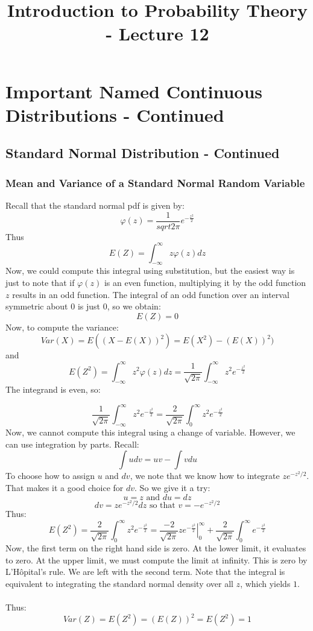 \documentclass[12pt]{article} %
\date{}
\title{Introduction to Probability Theory - Lecture 12}
\begin{document}
\maketitle

\section{Important Named Continuous Distributions - Continued}
\subsection{Standard Normal Distribution - Continued}
\subsubsection{Mean and Variance of a Standard Normal Random Variable}
Recall that the standard normal pdf is given by:
$$\varphi(z) = \frac1{sqrt{2\pi}}e^{-\frac{z^2}2}$$
Thus
$$E(Z) = \int_{-\infty}^{\infty}z\varphi(z) dz$$
Now, we could compute this integral using substitution, but the easiest way is just to note that if $\varphi(z)$ is an even function, multiplying it by the odd function $z$ results in an odd function. The integral of an odd function over an interval symmetric about $0$ is just 0, so we obtain:
$$E(Z) = 0$$ 
Now, to compute the variance:
$$Var(X) = E((X-E(X))^2) = E(X^2) - \left(E(X)\right)^2)$$
and
$$E(Z^2) = \int_{-\infty}^{\infty} z^2 \varphi(z) dz = \frac1{\sqrt{2\pi}}\int_{-\infty}^{\infty} z^2e^{-\frac{z^2}2} $$
The integrand is even, so:

$$ \frac1{\sqrt{2\pi}}\int_{-\infty}^{\infty} z^2e^{-\frac{z^2}2} =  \frac2{\sqrt{2\pi}}\int_{0}^{\infty} z^2e^{-\frac{z^2}2} $$
Now, we cannot compute this integral using a change of variable. However, we can use integration by parts. Recall:
$$\int u dv = uv - \int v du$$
To choose how to assign $u$ and $dv$, we note that we know how to integrate $ze^{-z^2/2}$. That makes it a good choice for $dv$. So we give it a try:
$$u=z \textrm{ and } du=dz$$
$$dv = ze^{-z^2/2}dz \textrm{ so that } v = -e^{-z^2/2}$$
Thus:
$$E(Z^2) =  \frac2{\sqrt{2\pi}}\int_{0}^{\infty} z^2e^{-\frac{z^2}2} = \frac{-2}{\sqrt{2\pi}} \left.z e^{-\frac{z^2}2}\right\rvert_0^\infty + \frac2{\sqrt{2\pi}}\int_{0}^{\infty} e^{-\frac{z^2}2}$$
Now, the first term on the right hand side is zero. At the lower limit, it evaluates to zero. At the upper limit, we must compute the limit at infinity. This is zero by L'H\^opital's rule. We are left with the second term. Note that the integral is equivalent to integrating the standard normal density over all $z$, which yields $1$.\\\\
Thus:
$$Var(Z) = E(Z^2) = \left(E(Z)\right)^2 = E(Z^2) = 1$$
\end{document}
